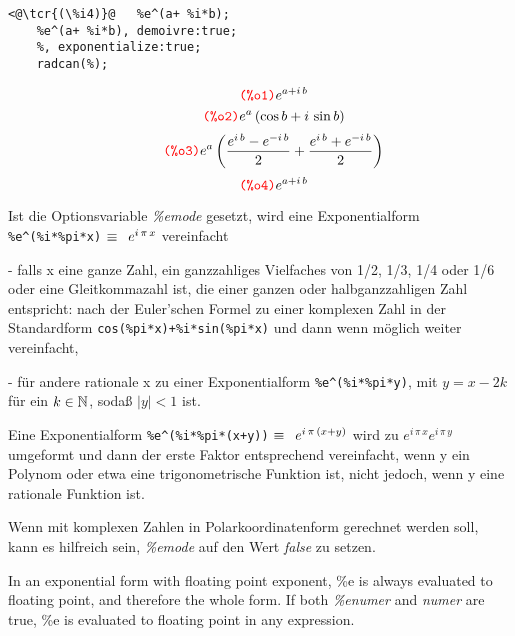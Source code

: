 \documentclass[../Maxima_Workbook.tex]{subfiles}
\begin{document}
\lz \begin{small}
\color{blue} \leqn
\begin{lstlisting}
<@\tcr{(\%i4)}@   %e^(a+ %i*b);
	%e^(a+ %i*b), demoivre:true;
	%, exponentialize:true;
	radcan(%);
\end{lstlisting}
\vspace{-4mm} \[\tag*{\tcr{\ttfamily (\%o1)}} e^{a+i \, b} \]
\vspace{-8mm} \[\tag*{\tcr{\ttfamily (\%o2)}} e^a \, (\cos b + i \, \sin b) \]
\vspace{-6mm} \[\tag*{\tcr{\ttfamily (\%o3)}} e^a \left( \frac{e^{i \, b} - e^{-i \, b}}{2} + \frac{e^{i \, b} + e^{-i \, b}}{2} \right) \]
\vspace{-4mm} \[\tag*{\tcr{\ttfamily (\%o4)}} e^{a+i \, b} \]
\color{black} \reqn
\end{small}

\lzz {} \qquad {} \hfill {}

\lz Ist die Optionsvariable \emph{\%emode} gesetzt, wird eine Exponentialform \verb|%e^(%i*%pi*x)| $ \equiv \enskip e^{i \, \pi \, x} $ vereinfacht 

\lz - falls x eine ganze Zahl, ein ganzzahliges Vielfaches von 1/2, 1/3, 1/4 oder 1/6 oder eine Gleitkommazahl ist, die einer ganzen oder halbganzzahligen Zahl entspricht: nach der Euler'schen Formel zu einer komplexen Zahl in der Standardform \verb|cos(%pi*x)+%i*sin(%pi*x)| und dann wenn möglich weiter vereinfacht,

\lz - für andere rationale x zu einer Exponentialform \verb|%e^(%i*%pi*y)|, mit $ y = x-2k $ für ein $ k \in \mathbb{N} $, sodaß $ |y| < 1 $ ist.

\lz Eine Exponentialform \verb|%e^(%i*%pi*(x+y))| $ \equiv \enskip e^{i \, \pi \, (x+y)} $ wird zu $ e^{i \, \pi \, x} e^{i \, \pi \, y} $ umgeformt und dann der erste Faktor entsprechend vereinfacht, wenn y ein Polynom oder etwa eine trigonometrische Funktion ist, nicht jedoch, wenn y eine rationale Funktion ist.

\lz Wenn mit komplexen Zahlen in Polarkoordinatenform gerechnet werden soll, kann es hilfreich sein, \emph{\%emode} auf den Wert \emph{false} zu setzen.

\lzz {} \qquad {} \hfill {}

\lz In an exponential form with floating point exponent, \%e is always evaluated to floating point, and therefore the whole form. If both \emph{\%enumer} and \emph{numer} are true, \%e is evaluated to floating point in any expression.
\end{document}
